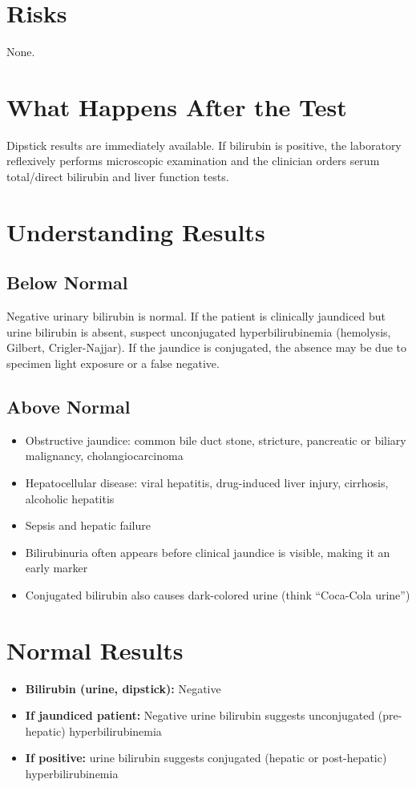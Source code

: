 \section*{Risks}
None.

\section*{What Happens After the Test}
Dipstick results are immediately available. If bilirubin is positive, the laboratory reflexively performs microscopic examination and the clinician orders serum total/direct bilirubin and liver function tests.

\section*{Understanding Results}

\subsection*{Below Normal}
Negative urinary bilirubin is normal. If the patient is clinically jaundiced but urine bilirubin is absent, suspect unconjugated hyperbilirubinemia (hemolysis, Gilbert, Crigler-Najjar). If the jaundice is conjugated, the absence may be due to specimen light exposure or a false negative.

\subsection*{Above Normal}
\begin{itemize}
  \item Obstructive jaundice: common bile duct stone, stricture, pancreatic or biliary malignancy, cholangiocarcinoma
  \item Hepatocellular disease: viral hepatitis, drug-induced liver injury, cirrhosis, alcoholic hepatitis
  \item Sepsis and hepatic failure
  \item Bilirubinuria often appears before clinical jaundice is visible, making it an early marker
  \item Conjugated bilirubin also causes dark-colored urine (think ``Coca-Cola urine'')
\end{itemize}

\section*{Normal Results}
\begin{itemize}
  \item \textbf{Bilirubin (urine, dipstick):} Negative
  \item \textbf{If jaundiced patient:} Negative urine bilirubin suggests unconjugated (pre-hepatic) hyperbilirubinemia
  \item \textbf{If positive:} urine bilirubin suggests conjugated (hepatic or post-hepatic) hyperbilirubinemia
\end{itemize}

